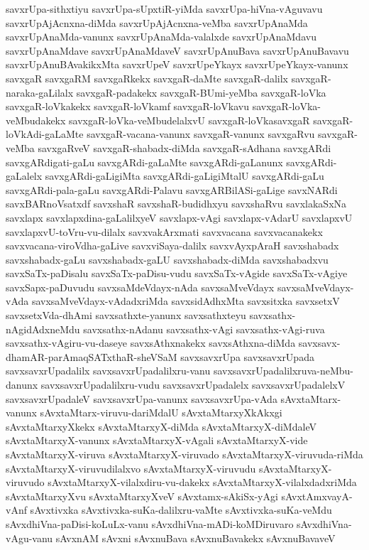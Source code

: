 {savxrUpa-sithxtiyu
savxrUpa-sUpxtiR-yiMda
savxrUpa-hiVna-vAguvavu
savxrUpAjAcnxna-diMda
savxrUpAjAcnxna-veMba
savxrUpAnaMda
savxrUpAnaMda-vanunx
savxrUpAnaMda-valalxde
savxrUpAnaMdavu
savxrUpAnaMdave
savxrUpAnaMdaveV
savxrUpAnuBava
savxrUpAnuBavavu
savxrUpAnuBAvakikxMta
savxrUpeV
savxrUpeYkayx
savxrUpeYkayx-vanunx
savxgaR
savxgaRM
savxgaRkekx
savxgaR-daMte
savxgaR-dalilx
savxgaR-naraka-gaLilalx
savxgaR-padakekx
savxgaR-BUmi-yeMba
savxgaR-loVka
savxgaR-loVkakekx
savxgaR-loVkamf
savxgaR-loVkavu
savxgaR-loVka-veMbudakekx
savxgaR-loVka-veMbudelalxvU
savxgaR-loVkasavxgaR
savxgaR-loVkAdi-gaLaMte
savxgaR-vacana-vanunx
savxgaR-vanunx
savxgaRvu
savxgaR-veMba
savxgaRveV
savxgaR-shabadx-diMda
savxgaR-sAdhana
savxgARdi
savxgARdigati-gaLu
savxgARdi-gaLaMte
savxgARdi-gaLanunx
savxgARdi-gaLalelx
savxgARdi-gaLigiMta
savxgARdi-gaLigiMtalU
savxgARdi-gaLu
savxgARdi-pala-gaLu
savxgARdi-Palavu
savxgARBilASi-gaLige
savxNARdi
savxBARnoVsatxdf
savxshaR
savxshaR-budidhxyu
savxshaRvu
savxlakaSxNa
savxlapx
savxlapxdina-gaLalilxyeV
savxlapx-vAgi
savxlapx-vAdarU
savxlapxvU
savxlapxvU-toVru-vu-dilalx
savxvakArxmati
savxvacana
savxvacanakekx
savxvacana-viroVdha-gaLive
savxviSaya-dalilx
savxvAyxpAraH
savxshabadx
savxshabadx-gaLu
savxshabadx-gaLU
savxshabadx-diMda
savxshabadxvu
savxSaTx-paDisalu
savxSaTx-paDisu-vudu
savxSaTx-vAgide
savxSaTx-vAgiye
savxSapx-paDuvudu
savxsaMdeVdayx-nAda
savxsaMveVdayx
savxsaMveVdayx-vAda
savxsaMveVdayx-vAdadxriMda
savxsidAdhxMta
savxsitxka
savxsetxV
savxsetxVda-dhAmi
savxsathxte-yanunx
savxsathxteyu
savxsathx-nAgidAdxneMdu
savxsathx-nAdanu
savxsathx-vAgi
savxsathx-vAgi-ruva
savxsathx-vAgiru-vu-daseye
savxsAthxnakekx
savxsAthxna-diMda
savxsavx-dhamAR-parAmaqSATxthaR-sheVSaM
savxsavxrUpa
savxsavxrUpada
savxsavxrUpadalilx
savxsavxrUpadalilxru-vanu
savxsavxrUpadalilxruva-neMbu-danunx
savxsavxrUpadalilxru-vudu
savxsavxrUpadalelx
savxsavxrUpadalelxV
savxsavxrUpadaleV
savxsavxrUpa-vanunx
savxsavxrUpa-vAda
sAvxtaMtarx-vanunx
sAvxtaMtarx-viruvu-dariMdalU
sAvxtaMtarxyXkAkxgi
sAvxtaMtarxyXkekx
sAvxtaMtarxyX-diMda
sAvxtaMtarxyX-diMdaleV
sAvxtaMtarxyX-vanunx
sAvxtaMtarxyX-vAgali
sAvxtaMtarxyX-vide
sAvxtaMtarxyX-viruva
sAvxtaMtarxyX-viruvado
sAvxtaMtarxyX-viruvuda-riMda
sAvxtaMtarxyX-viruvudilalxvo
sAvxtaMtarxyX-viruvudu
sAvxtaMtarxyX-viruvudo
sAvxtaMtarxyX-vilalxdiru-vu-dakekx
sAvxtaMtarxyX-vilalxdadxriMda
sAvxtaMtarxyXvu
sAvxtaMtarxyXveV
sAvxtamx-sAkiSx-yAgi
sAvxtAmxvayA-vAnf
sAvxtivxka
sAvxtivxka-suKa-dalilxru-vaMte
sAvxtivxka-suKa-veMdu
sAvxdhiVna-paDisi-koLuLx-vanu
sAvxdhiVna-mADi-koMDiruvaro
sAvxdhiVna-vAgu-vanu
sAvxnAM
sAvxni
sAvxnuBava
sAvxnuBavakekx
sAvxnuBavaveV
}
